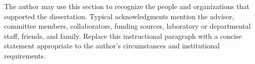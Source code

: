 The author may use this section to recognize the people and organizations that supported the dissertation. Typical acknowledgments mention the advisor, committee members, collaborators, funding sources, laboratory or departmental staff, friends, and family. Replace this instructional paragraph with a concise statement appropriate to the author's circumstances and institutional requirements.
